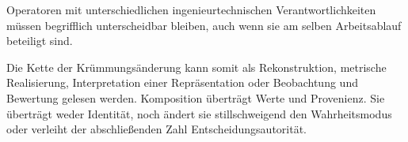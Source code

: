 \begin{principle}[Operatortrennung]
\label{princ:operator-separation}
Operatoren mit unterschiedlichen ingenieurtechnischen Verantwortlichkeiten
müssen begrifflich unterscheidbar bleiben, auch wenn sie am selben
Arbeitsablauf beteiligt sind.
\end{principle}

Die Kette der Krümmungsänderung kann somit als Rekonstruktion, metrische
Realisierung, Interpretation einer Repräsentation oder Beobachtung und
Bewertung gelesen werden. Komposition überträgt Werte und Provenienz. Sie
überträgt weder Identität, noch ändert sie stillschweigend den Wahrheitsmodus
oder verleiht der abschließenden Zahl Entscheidungsautorität.
